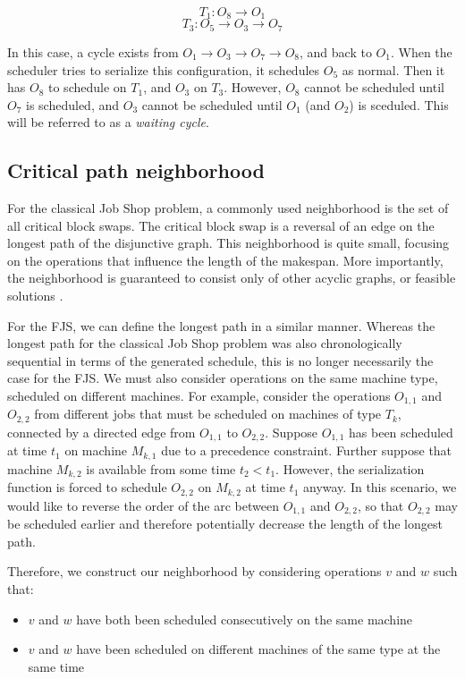 \documentclass[a4paper,10pt]{article}
\begin{document}
\[ T_1\colon O_8 \rightarrow O_1 \]
\[ T_3\colon O_5 \rightarrow O_3 \rightarrow O_7 \]

In this case, a cycle exists from $O_1 \rightarrow O_3 \rightarrow O_7 \rightarrow O_8$, and back to $O_1$. When the scheduler tries to serialize this configuration, it schedules $O_5$ as normal. Then it has $O_8$ to schedule on $T_1$, and $O_3$ on $T_3$. However, $O_8$ cannot be scheduled until $O_7$ is scheduled, and $O_3$ cannot be scheduled until $O_1$ (and $O_2$) is sceduled. This will be referred to as a \emph{waiting cycle}.

\subsection{Critical path neighborhood}

For the classical Job Shop problem, a commonly used neighborhood is the set of all critical block swaps. The critical block swap is a reversal of an edge on the longest path of the disjunctive graph. This neighborhood is quite small, focusing on the operations that influence the length of the makespan. More importantly, the neighborhood is guaranteed to consist only of other acyclic graphs, or feasible solutions \cite{simulatedannealingjsp}.

For the FJS, we can define the longest path in a similar manner. Whereas the longest path for the classical Job Shop problem was also chronologically sequential in terms of the generated schedule, this is no longer necessarily the case for the FJS. We must also consider operations on the same machine type, scheduled on different machines. For example, consider the operations $O_{1,1}$ and $O_{2,2}$ from different jobs that must be scheduled on machines of type $T_k$, connected by a directed edge from $O_{1,1}$ to $O_{2,2}$. Suppose $O_{1,1}$ has been scheduled at time $t_1$ on machine $M_{k,1}$ due to a precedence constraint. Further suppose that machine $M_{k,2}$ is available from some time $t_2 < t_1$. However, the serialization function is forced to schedule $O_{2,2}$ on $M_{k,2}$ at time $t_1$ anyway. In this scenario, we would like to reverse the order of the arc between $O_{1,1}$ and $O_{2,2}$, so that $O_{2,2}$ may be scheduled earlier and therefore potentially decrease the length of the longest path.

Therefore, we construct our neighborhood by considering operations $v$ and $w$ such that:

\begin{itemize}
	\item $v$ and $w$ have both been scheduled consecutively on the same machine
	\item $v$ and $w$ have been scheduled on different machines of the same type at the same time
\end{itemize}
\end{document}
